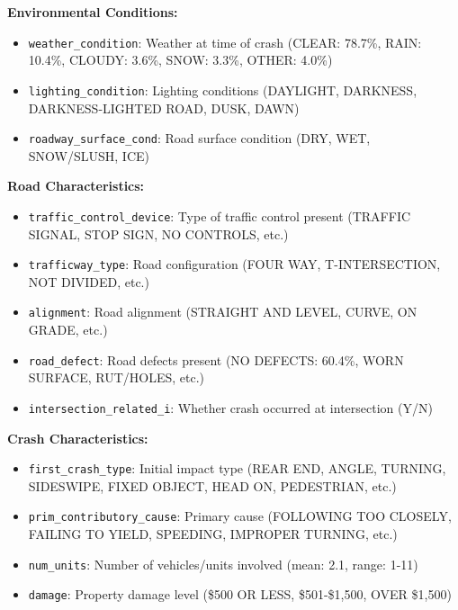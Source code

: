 \documentclass[12pt,man]{apa7}
\begin{document}
\textbf{Environmental Conditions:}
\begin{itemize}
    \item \texttt{weather\_condition}: Weather at time of crash (CLEAR: 78.7\%, RAIN: 10.4\%, CLOUDY: 3.6\%, SNOW: 3.3\%, OTHER: 4.0\%)
    \item \texttt{lighting\_condition}: Lighting conditions (DAYLIGHT, DARKNESS, DARKNESS-LIGHTED ROAD, DUSK, DAWN)
    \item \texttt{roadway\_surface\_cond}: Road surface condition (DRY, WET, SNOW/SLUSH, ICE)
\end{itemize}

\textbf{Road Characteristics:}
\begin{itemize}
    \item \texttt{traffic\_control\_device}: Type of traffic control present (TRAFFIC SIGNAL, STOP SIGN, NO CONTROLS, etc.)
    \item \texttt{trafficway\_type}: Road configuration (FOUR WAY, T-INTERSECTION, NOT DIVIDED, etc.)
    \item \texttt{alignment}: Road alignment (STRAIGHT AND LEVEL, CURVE, ON GRADE, etc.)
    \item \texttt{road\_defect}: Road defects present (NO DEFECTS: 60.4\%, WORN SURFACE, RUT/HOLES, etc.)
    \item \texttt{intersection\_related\_i}: Whether crash occurred at intersection (Y/N)
\end{itemize}

\textbf{Crash Characteristics:}
\begin{itemize}
    \item \texttt{first\_crash\_type}: Initial impact type (REAR END, ANGLE, TURNING, SIDESWIPE, FIXED OBJECT, HEAD ON, PEDESTRIAN, etc.)
    \item \texttt{prim\_contributory\_cause}: Primary cause (FOLLOWING TOO CLOSELY, FAILING TO YIELD, SPEEDING, IMPROPER TURNING, etc.)
    \item \texttt{num\_units}: Number of vehicles/units involved (mean: 2.1, range: 1-11)
    \item \texttt{damage}: Property damage level (\$500 OR LESS, \$501-\$1,500, OVER \$1,500)
\end{itemize}
\end{document}
